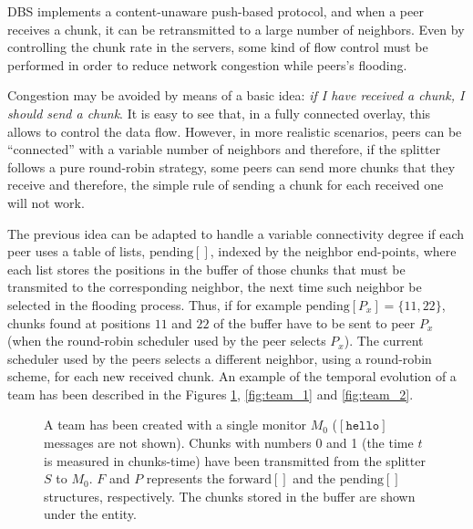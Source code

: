 
\label{sec:chunk_flooding}

\begin{comment}
\begin{figure*}
  \imgw{300}{graphics/peer_chunk_flooding.svg}
  \caption{Chunk flooding at peers.\label{fig:peer_chunk_flooding}}
\end{figure*}
\end{comment}

DBS implements a content-unaware push-based protocol, and when a peer
receives a chunk, it can be retransmitted to a large number of
neighbors. Even by controlling the chunk rate in the servers, some
kind of flow control must be performed in order to reduce network
congestion while peers's flooding.


Congestion may be avoided by means of a basic idea: \textit{if I have
  received a chunk, I should send a chunk}. It is easy to see that, in
a fully connected overlay, this allows to control the data
flow. However, in more realistic scenarios, peers can be ``connected''
with a variable number of neighbors and therefore, if the splitter
follows a pure round-robin strategy, some peers can send more chunks
that they receive and therefore, the simple rule of sending a chunk
for each received one will not work.

The previous idea can be adapted to handle a variable connectivity
degree if each peer uses a table of lists, $\text{pending}[]$, indexed
by the neighbor end-points, where each list stores the positions in
the buffer of those chunks that must be transmited to the
corresponding neighbor, the next time such neighbor be selected in the
flooding process. Thus, if for example
$\text{pending}[P_x]=\{11,22\}$, chunks found at positions $11$ and
$22$ of the buffer have to be sent to peer $P_x$ (when the round-robin
scheduler used by the peer selects $P_x$). The current scheduler used
by the peers selects a different neighbor, using a round-robin scheme,
for each new received chunk. An example of the temporal evolution of a
team has been described in the Figures \ref{fig:team_0},
\ref{fig:team_1} and \ref{fig:team_2}.

\begin{figure}
   \caption{A team has been created with a
    single monitor $M_0$ ($[\mathtt{hello}]$ messages are not
    shown). Chunks with numbers 0 and 1 (the time $t$ is measured in
    chunks-time) have been transmitted from the splitter $S$ to
    $M_0$. $F$ and $P$ represents the $\text{forward}[]$ and the
    $\text{pending}[]$ structures, respectively. The chunks stored in
    the buffer are shown under the entity.\label{fig:team_0}}
\end{figure}

